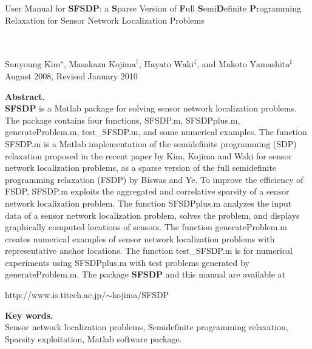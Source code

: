 \documentclass[12pt]{article}
\begin{document}
\thispagestyle{empty}

\noindent
\parbox[t]{14cm}
{User Manual for {\bf SFSDP}:  a {\bf S}parse  Version of  {\bf F}ull   {\bf S}emi{\bf D}efinite
	{\bf P}rogramming Relaxation  for Sensor Network Localization Problems} \\~\vspace{0.2cm}\\
$\mbox{Sunyoung Kim}^{\star}$,
$\mbox{Masakazu Kojima}^{\dagger}$, 
$\mbox{Hayato Waki}^{\ddagger}$, and 
$\mbox{Makoto Yamashita}^{\sharp}$\vspace{0.2cm}\\
August 2008, Revised January 2010

\medskip

\noindent
{\bf Abstract.} \vspace{2mm}\\ 
{\bf SFSDP} is a Matlab package for solving 
sensor network localization problems. 
The package contains  four functions, SFSDP.m, SFSDPplus.m, generateProblem.m, test\_SFSDP.m, 
and  some numerical examples. 
The function SFSDP.m is a Matlab implementation of the semidefinite programming 
(SDP) relaxation  proposed in the recent paper by Kim, Kojima and Waki 
for sensor network localization problems, 
as a sparse version of the full semidefinite programming relaxation (FSDP)  
by Biswas and Ye. To improve the efficiency of FSDP, SFSDP.m  exploits 
the aggregated and correlative sparsity of a sensor network localization problem. 
The function SFSDPplus.m analyzes the input data of a sensor network localization problem, 
solves the problem, and displays graphically computed locations of sensors. The function generateProblem.m
creates numerical examples of sensor network localization problems with representative
anchor locations. The function test\_SFSDP.m is for numerical experiments using SFSDPplus.m 
with test problems  generated by generateProblem.m. 
The  package {\bf SFSDP} and this manual
are available at

\vspace{-3mm} 

\begin{center}
\mbox{http://www.is.titech.ac.jp/$\sim$kojima/SFSDP}
\end{center}

\medskip
  
\noindent
{\bf Key words. } \vspace{0.1cm} \\
Sensor network localization problems, 
Semidefinite programming relaxation, Sparsity exploitation,  Matlab software package.
\end{document}
